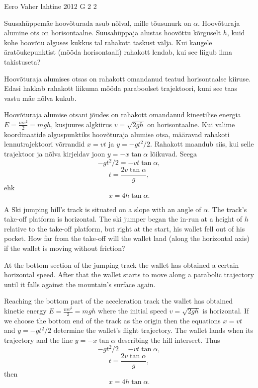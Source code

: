 {Eero Vaher} %
{lahtine} %
{2012} %
{G 2} %
{2} %
{
\ifStatement
Suusahüppemäe hoovõturada asub nõlval, mille tõusunurk on $\alpha$. Hoovõturaja alumine
ots on horisontaalne. Suusahüppaja alustas hoovõttu kõrguselt $h$,
kuid kohe hoovõtu alguses kukkus tal rahakott taskust välja. Kui kaugele
äratõukepunktist (mööda
horisontaali) rahakott lendab, kui see liigub ilma takistuseta?
\fi


\ifHint
Hoovõturaja alumises otsas on rahakott omandanud teatud horisontaalse kiiruse. Edasi hakkab rahakott liikuma mööda paraboolset trajektoori, kuni see taas vastu mäe nõlva kukub.
\fi


\ifSolution
Hoovõturaja alumise otsani jõudes on rahakott omandanud kineetilise energia $E=\frac{mv^2}{2}=mgh$, kusjuures algkiirus $v=\sqrt{2gh}$ on horisontaalne. Kui valime koordinaatide alguspunktiks hoovõturaja alumise otsa, määravad rahakoti lennutrajektoori võrrandid $x=vt$ ja $y=-gt^2 / 2$. Rahakott maandub siis, kui selle trajektoor ja nõlva kirjeldav joon $y=-x\tan\alpha$ lõikuvad. Seega 
$$-gt^2 / 2=-vt\tan\alpha,$$ 
$$t=\frac{2v \tan \alpha}{g},$$ 
ehk
$$x=4h \tan\alpha.$$
\fi


\ifEngStatement
A Ski jumping hill’s track is situated on a slope with an angle of $\alpha$. The track’s take-off platform is horizontal. The ski jumper began the in-run at a height of $h$ relative to the take-off platform, but right at the start, his wallet fell out of his pocket. How far from the take-off will the wallet land (along the horizontal axis) if the wallet is moving without friction?
\fi


\ifEngHint
At the bottom section of the jumping track the wallet has obtained a certain horizontal speed. After that the wallet starts to move along a parabolic trajectory until it falls against the mountain’s surface again.
\fi


\ifEngSolution
Reaching the bottom part of the acceleration track the wallet has obtained kinetic energy $E=\frac{mv^2}{2}=mgh$ where the initial speed $v=\sqrt{2gh}$ is horizontal. If we choose the bottom end of the track as the origin then the equations $x=vt$ and $y=-gt^2 / 2$ determine the wallet’s flight trajectory. The wallet lands when its trajectory and the line $y=-x\tan\alpha$ describing the hill intersect. Thus
$$-gt^2 / 2=-vt\tan\alpha,$$
$$t=\frac{2v \tan \alpha}{g},$$
then $$x=4h \tan\alpha.$$
\fi
}